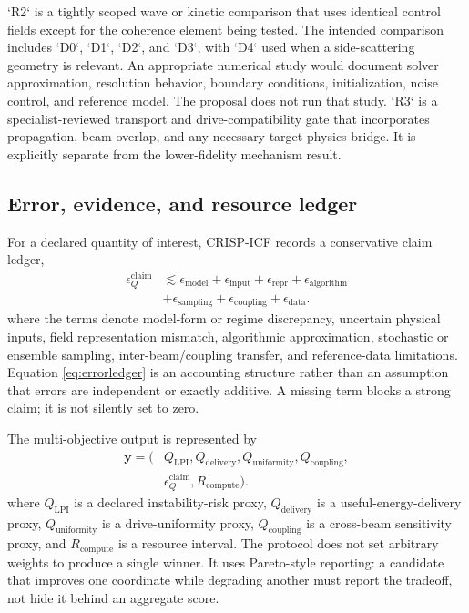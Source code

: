 \documentclass[conference]{../../../../Conference-LaTeX-template_10-17-19/IEEEtran}
\begin{document}
`R2` is a tightly scoped wave or kinetic comparison that uses identical control fields except for the coherence element being tested. The intended comparison includes `D0`, `D1`, `D2`, and `D3`, with `D4` used when a side-scattering geometry is relevant. An appropriate numerical study would document solver approximation, resolution behavior, boundary conditions, initialization, noise control, and reference model. The proposal does not run that study. `R3` is a specialist-reviewed transport and drive-compatibility gate that incorporates propagation, beam overlap, and any necessary target-physics bridge. It is explicitly separate from the lower-fidelity mechanism result.

\subsection{Error, evidence, and resource ledger}
For a declared quantity of interest, CRISP-ICF records a conservative claim ledger,
\begin{align}
\epsilon_Q^{\mathrm{claim}} &\lesssim \epsilon_{\mathrm{model}}+\epsilon_{\mathrm{input}}+\epsilon_{\mathrm{repr}}+\epsilon_{\mathrm{algorithm}} \nonumber\\
&+\epsilon_{\mathrm{sampling}}+\epsilon_{\mathrm{coupling}}+\epsilon_{\mathrm{data}}.
\label{eq:errorledger}
\end{align}
where the terms denote model-form or regime discrepancy, uncertain physical inputs, field representation mismatch, algorithmic approximation, stochastic or ensemble sampling, inter-beam/coupling transfer, and reference-data limitations. Equation \eqref{eq:errorledger} is an accounting structure rather than an assumption that errors are independent or exactly additive. A missing term blocks a strong claim; it is not silently set to zero.

The multi-objective output is represented by
\begin{align}
\mathbf{y}=\bigl(&Q_{\mathrm{LPI}},Q_{\mathrm{delivery}},Q_{\mathrm{uniformity}},Q_{\mathrm{coupling}}, \nonumber\\
&\epsilon_Q^{\mathrm{claim}},R_{\mathrm{compute}}\bigr).
\label{eq:outcomevector}
\end{align}
where $Q_{\mathrm{LPI}}$ is a declared instability-risk proxy, $Q_{\mathrm{delivery}}$ is a useful-energy-delivery proxy, $Q_{\mathrm{uniformity}}$ is a drive-uniformity proxy, $Q_{\mathrm{coupling}}$ is a cross-beam sensitivity proxy, and $R_{\mathrm{compute}}$ is a resource interval. The protocol does not set arbitrary weights to produce a single winner. It uses Pareto-style reporting: a candidate that improves one coordinate while degrading another must report the tradeoff, not hide it behind an aggregate score.
\end{document}

